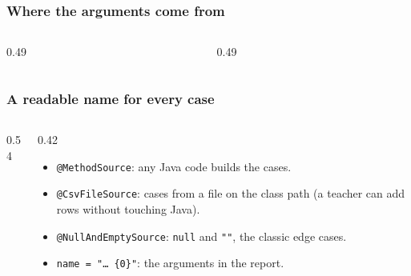 \documentclass[aspectratio=169,10pt,compress]{beamer}
\begin{document}




\begin{frame}[t,fragile] \frametitle{Where the arguments come from}
  \begin{columns}[T]
    \begin{column}{0.49\textwidth}
    \end{column}
    \begin{column}{0.49\textwidth}
    \end{column}
  \end{columns}
\end{frame}




\begin{frame}[t,fragile] \frametitle{A readable name for every case}
  \begin{columns}[T]
    \begin{column}{0.54\textwidth}
    \end{column}
    \begin{column}{0.42\textwidth}
      \begin{itemize}\small
        \item \texttt{@MethodSource}: any Java code builds the cases.
        \item \texttt{@CsvFileSource}: cases from a file on the class path (a teacher can add rows without touching Java).
        \item \texttt{@NullAndEmptySource}: \texttt{null} and \texttt{""}, the classic edge cases.
        \item \texttt{name = "\dots\ \{0\}"}: the arguments in the report.
      \end{itemize}
    \end{column}
  \end{columns}
\end{frame}

\end{document}
